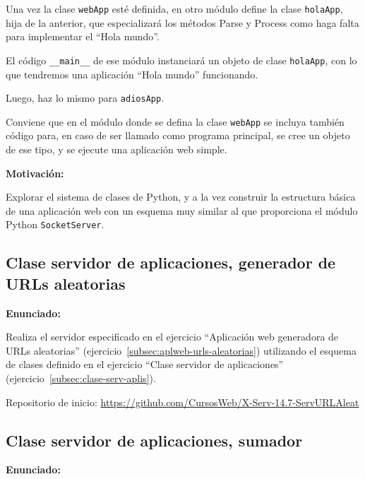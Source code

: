 Una vez la clase \texttt{webApp} esté definida, en otro módulo define la clase \texttt{holaApp}, hija de la anterior, que especializará los métodos Parse y Process como haga falta para implementar el ``Hola mundo''.

El código \verb|__main__| de ese módulo instanciará un objeto de clase \texttt{holaApp}, con lo que tendremos una aplicación ``Hola mundo'' funcionando.

Luego, haz lo mismo para \texttt{adiosApp}.

Conviene que en el módulo donde se defina la clase \texttt{webApp} se incluya también código para, en caso de ser llamado como programa principal, se cree un objeto de ese tipo, y se ejecute una aplicación web simple.

\textbf{Motivación:}

Explorar el sistema de clases de Python, y a la vez construir la estructura básica de una aplicación web con un esquema muy similar al que proporciona el módulo Python \texttt{SocketServer}.

\subsection{Clase servidor de aplicaciones, generador de URLs aleatorias}
\label{subsec:aplweb-clase-urls-aleatorias}

\textbf{Enunciado:}

Realiza el servidor especificado en el ejercicio ``Aplicación web generadora de URLs aleatorias'' (ejercicio~\ref{subsec:aplweb-urls-aleatorias}) utilizando el esquema de clases definido en el ejercicio ``Clase servidor de aplicaciones'' (ejercicio~\ref{subsec:clase-serv-aplis}).

Repositorio de inicio: \url{https://github.com/CursosWeb/X-Serv-14.7-ServURLAleat}

\subsection{Clase servidor de aplicaciones, sumador}
\label{subsec:clase-sumador-simple}

\textbf{Enunciado:}

